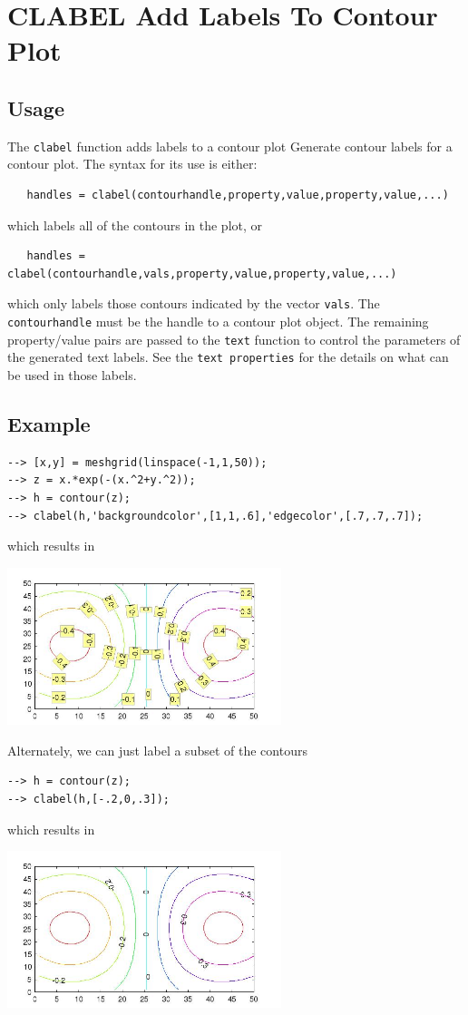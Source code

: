 \section{CLABEL Add Labels To Contour Plot}

\subsection{Usage}

The \verb|clabel| function adds labels to a contour plot
Generate contour labels for a contour plot.  The syntax
for its use is either:
\begin{verbatim}
   handles = clabel(contourhandle,property,value,property,value,...)
\end{verbatim}
which labels all of the contours in the plot, or
\begin{verbatim}
   handles = clabel(contourhandle,vals,property,value,property,value,...)
\end{verbatim}
which only labels those contours indicated by the vector \verb|vals|.
The \verb|contourhandle| must be the handle to a contour plot object.
The remaining property/value pairs are passed to the \verb|text| function
to control the parameters of the generated text labels.  See the 
\verb|text properties| for the details on what can be used in those labels.
\subsection{Example}

\begin{verbatim}
--> [x,y] = meshgrid(linspace(-1,1,50));
--> z = x.*exp(-(x.^2+y.^2));
--> h = contour(z);
--> clabel(h,'backgroundcolor',[1,1,.6],'edgecolor',[.7,.7,.7]);
\end{verbatim}
which results in


\centerline{\includegraphics[width=8cm]{clabel1}}

Alternately, we can just label a subset of the contours
\begin{verbatim}
--> h = contour(z);
--> clabel(h,[-.2,0,.3]);
\end{verbatim}
which results in


\centerline{\includegraphics[width=8cm]{clabel2}}

